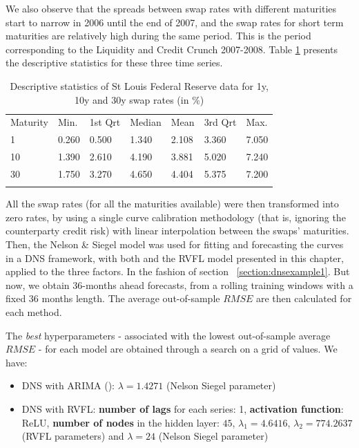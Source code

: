 \medskip

We also observe that the spreads between swap rates with different maturities start to narrow in 2006 until the end of 2007, and the  swap rates for short term maturities are relatively high during the same period. This is the period corresponding to the Liquidity and Credit Crunch 2007-2008. Table \ref{tab:freddatatables1} presents the descriptive statistics for these three time series. 

\begin{table}
\begin{center}
\caption{Descriptive statistics of St Louis Federal Reserve data for 1y, 10y and 30y swap rates (in \%)}
\label{tab:freddatatables1}       %
\begin{tabular}{lllllll}
\hline\noalign{\smallskip}
Maturity & Min. & 1st Qrt & Median & Mean & 3rd Qrt & Max.\\
\noalign{\smallskip}\hline\noalign{\smallskip}
  1  & 0.260 & 0.500  & 1.340  & 2.108  & 3.360  & 7.050\\
  10 & 1.390 & 2.610  & 4.190  & 3.881  & 5.020  & 7.240\\
  30 & 1.750 & 3.270  & 4.650  & 4.404  & 5.375  & 7.200\\
\noalign{\smallskip}\hline
\end{tabular}
\end{center}
\end{table}

\medskip

All the swap rates (for all the maturities available) were then transformed into zero rates, by using a single curve calibration methodology (that is, ignoring the counterparty credit risk) with linear interpolation between the swaps' maturities. Then, the Nelson \& Siegel model was used for fitting and forecasting the curves in a DNS framework, with both  and the RVFL model presented in this chapter, applied to the three factors. In the fashion of section ~\ref{section:dnsexample1}. But now, we obtain 36-months ahead forecasts, from a rolling training windows with a fixed 36 months length. The average out-of-sample $RMSE$ are then calculated for each method. 

\medskip

The \textit{best} hyperparameters - associated with the lowest out-of-sample average $RMSE$ - for each model are obtained through a search on a grid of values. We have:
\begin{itemize}
\item DNS with ARIMA (): $\lambda = 1.4271$ (Nelson Siegel parameter)  
\item DNS with RVFL: \textbf{number of lags} for each series: 1, \textbf{activation function}: ReLU, \textbf{number of nodes} in the hidden layer: $45$, $\lambda_1 = 4.6416$, $\lambda_2 = 774.2637$ (RVFL parameters) and $\lambda = 24$ (Nelson Siegel parameter)   
\end{itemize}

